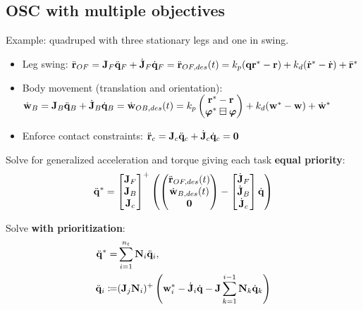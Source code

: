 \documentclass[a4paper, 8pt]{extarticle}
\begin{document}
\begin{multicols*}{3}
\subsection*{OSC with multiple objectives}
Example: quadruped with three stationary legs and one in swing.
\begin{itemize}
\item Leg swing: $\ddot{\bf r}_{OF} = {\bf J}_F\ddot{\bf q}_F + \dot{\bf J}_F\dot{\bf q}_F = \ddot{\bf r}_{OF,des}(t) = k_p({\bf q
r}^* - {\bf r}) + k_d(\dot{\bf r}^* - \dot{\bf r}) + \ddot{\bf r}^*$
\item Body movement (translation and orientation): $\dot{\bf w}_B = {\bf J}_B\ddot{\bf q}_B + \dot{\bf J}_B\dot{\bf q}_B = \dot{\bf w}_{OB,des}(t) = k_p\begin{pmatrix}{\bf r}^* - {\bf r}\\ 
\bm \varphi^* \boxminus \bm \varphi
\end{pmatrix} + k_d({\bf w}^* - {\bf w}) + \dot{\bf w}^*$
\item Enforce contact constraints: $\ddot{\bf r}_c = {\bf J}_c\ddot{\bf q}_c + \dot{\bf J}_c\dot{\bf q}_c = {\bf 0}$
\end{itemize}
Solve for generalized acceleration and torque giving each task \textbf{equal priority}:
\begin{align*}
\ddot{\bf q}^* = \begin{bmatrix}
{\bf J}_F \\
{\bf J}_B \\
{\bf J}_c
\end{bmatrix}^+\left(
\begin{pmatrix}
\ddot{\bf r}_{OF,des}(t) \\
\dot{\bf w}_{B,des}(t)   \\
{\bf 0}
\end{pmatrix} - \begin{bmatrix}
\dot{\bf J}_F \\
\dot{\bf J}_B \\
\dot{\bf J}_c
\end{bmatrix} \dot{\bf q}
\right)
\end{align*}

Solve \textbf{with prioritization}:
\begin{align*}
\ddot{\bf q}^* =& \sum_{i=1}^{n_t}{\bf N}_i\ddot{\bf q}_i, \\
\ddot{\bf q}_i  \coloneqq&  ({\bf J}_j{\bf N}_i)^+ \left( {\bf w}_i^* - \dot{\bf J}_i\dot{\bf q} - {\bf J}\sum_{k = 1}^{i-1}{\bf N}_k\dot{\bf q}_k \right)
\end{align*}


\end{multicols*}
\end{document}
